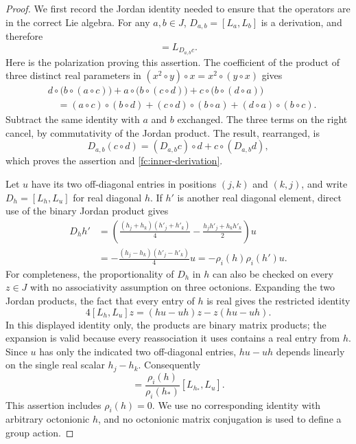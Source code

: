 \documentclass[11pt]{article}
\theoremstyle{definition}
\begin{document}
\begin{proof}
We first record the Jordan identity needed to ensure that the operators
are in the correct Lie algebra. For any $a,b\in J$,
$D_{a,b}=[L_a,L_b]$ is a derivation, and therefore
\begin{equation}
 [D_{a,b},L_c]=L_{D_{a,b}c}.
 \label{fc:inner-derivation}
\end{equation}
Here is the polarization proving this assertion. The coefficient of the
product of three distinct real parameters in
$(x^2\circ y)\circ x=x^2\circ(y\circ x)$ gives
\[
 \begin{split}
 &d\circ\bigl(b\circ(a\circ c)\bigr)
 +a\circ\bigl(b\circ(c\circ d)\bigr)
 +c\circ\bigl(b\circ(d\circ a)\bigr)\\
 &\hspace{1em}=(a\circ c)\circ(b\circ d)
 +(c\circ d)\circ(b\circ a)
 +(d\circ a)\circ(b\circ c).
 \end{split}
\]
Subtract the same identity with $a$ and $b$ exchanged. The three
terms on the right cancel, by commutativity of the Jordan product.
The result, rearranged, is
\[
 D_{a,b}(c\circ d)=(D_{a,b}c)\circ d+c\circ(D_{a,b}d),
\]
which proves the assertion and \eqref{fc:inner-derivation}.

Let $u$ have its two off-diagonal entries in positions $(j,k)$ and
$(k,j)$, and write $D_h=[L_h,L_u]$ for real diagonal $h$.
If $h'$ is another real diagonal element, direct use of the binary
Jordan product gives
\begin{equation}
 \begin{split}
 D_hh'
 &=\left(\frac{(h_j+h_k)(h'_j+h'_k)}4
                 -\frac{h_jh'_j+h_kh'_k}2\right)u\\
 &=-\frac{(h_j-h_k)(h'_j-h'_k)}4u
  =-\rho_i(h)\rho_i(h')u.
 \end{split}
 \label{fc:diagonal-calculation}
\end{equation}
For completeness, the proportionality of $D_h$ in $h$ can also be
checked on every $z\in J$ with no associativity assumption on three
octonions. Expanding the two Jordan products, the fact that every
entry of $h$ is real gives the restricted identity
\[
 4[L_h,L_u]z=(hu-uh)z-z(hu-uh).
\]
In this displayed identity only, the products are binary matrix
products; the expansion is valid because every reassociation it uses
contains a real entry from $h$. Since $u$ has only the indicated two
off-diagonal entries, $hu-uh$ depends linearly on the single real
scalar $h_j-h_k$. Consequently
\begin{equation}
 [L_h,L_u]=\frac{\rho_i(h)}{\rho_i(h_*)}[L_{h_*},L_u].
 \label{fc:proportionality}
\end{equation}
This assertion includes $\rho_i(h)=0$. We use no corresponding
identity with arbitrary octonionic $h$, and no octonionic matrix
conjugation is used to define a group action.


\end{proof}
\end{document}
